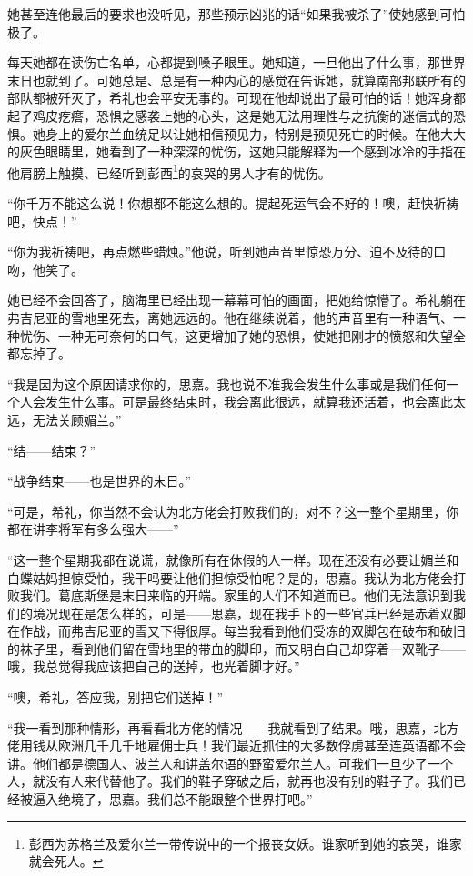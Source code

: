 \par 她甚至连他最后的要求也没听见，那些预示凶兆的话“如果我被杀了”使她感到可怕极了。
\par 每天她都在读伤亡名单，心都提到嗓子眼里。她知道，一旦他出了什么事，那世界末日也就到了。可她总是、总是有一种内心的感觉在告诉她，就算南部邦联所有的部队都被歼灭了，希礼也会平安无事的。可现在他却说出了最可怕的话！她浑身都起了鸡皮疙瘩，恐惧之感袭上她的心头，这是她无法用理性与之抗衡的迷信式的恐惧。她身上的爱尔兰血统足以让她相信预见力，特别是预见死亡的时候。在他大大的灰色眼睛里，她看到了一种深深的忧伤，这她只能解释为一个感到冰冷的手指在他肩膀上触摸、已经听到彭西\footnote{彭西为苏格兰及爱尔兰一带传说中的一个报丧女妖。谁家听到她的哀哭，谁家就会死人。}的哀哭的男人才有的忧伤。
\par “你千万不能这么说！你想都不能这么想的。提起死运气会不好的！噢，赶快祈祷吧，快点！”
\par “你为我祈祷吧，再点燃些蜡烛。”他说，听到她声音里惊恐万分、迫不及待的口吻，他笑了。
\par 她已经不会回答了，脑海里已经出现一幕幕可怕的画面，把她给惊懵了。希礼躺在弗吉尼亚的雪地里死去，离她远远的。他在继续说着，他的声音里有一种语气、一种忧伤、一种无可奈何的口气，这更增加了她的恐惧，使她把刚才的愤怒和失望全都忘掉了。
\par “我是因为这个原因请求你的，思嘉。我也说不准我会发生什么事或是我们任何一个人会发生什么事。可是最终结束时，我会离此很远，就算我还活着，也会离此太远，无法关顾媚兰。”
\par “结——结束？”
\par “战争结束——也是世界的末日。”
\par “可是，希礼，你当然不会认为北方佬会打败我们的，对不？这一整个星期里，你都在讲李将军有多么强大——”
\par “这一整个星期我都在说谎，就像所有在休假的人一样。现在还没有必要让媚兰和白蝶姑妈担惊受怕，我干吗要让他们担惊受怕呢？是的，思嘉。我认为北方佬会打败我们。葛底斯堡是末日来临的开端。家里的人们不知道而已。他们无法意识到我们的境况现在是怎么样的，可是——思嘉，现在我手下的一些官兵已经是赤着双脚在作战，而弗吉尼亚的雪又下得很厚。每当我看到他们受冻的双脚包在破布和破旧的袜子里，看到他们留在雪地里的带血的脚印，而又明白自己却穿着一双靴子——哦，我总觉得我应该把自己的送掉，也光着脚才好。”
\par “噢，希礼，答应我，别把它们送掉！”
\par “我一看到那种情形，再看看北方佬的情况——我就看到了结果。哦，思嘉，北方佬用钱从欧洲几千几千地雇佣士兵！我们最近抓住的大多数俘虏甚至连英语都不会讲。他们都是德国人、波兰人和讲盖尔语的野蛮爱尔兰人。可我们一旦少了一个人，就没有人来代替他了。我们的鞋子穿破之后，就再也没有别的鞋子了。我们已经被逼入绝境了，思嘉。我们总不能跟整个世界打吧。”
